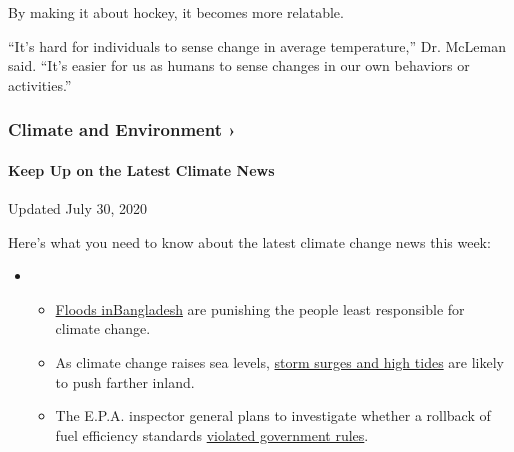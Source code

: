 By making it about hockey, it becomes more relatable.

``It's hard for individuals to sense change in average temperature,''
Dr. McLeman said. ``It's easier for us as humans to sense changes in our
own behaviors or activities.''

\href{https://www.nytimes3xbfgragh.onion/section/climate?action=click\&pgtype=Article\&state=default\&region=MAIN_CONTENT_1\&context=storylines_keepup}{}

\hypertarget{climate-and-environment-}{%
\subsubsection{Climate and Environment
›}\label{climate-and-environment-}}

\hypertarget{keep-up-on-the-latest-climate-news}{%
\paragraph{Keep Up on the Latest Climate
News}\label{keep-up-on-the-latest-climate-news}}

Updated July 30, 2020

Here's what you need to know about the latest climate change news this
week:

\begin{itemize}
\item
  \begin{itemize}
  \tightlist
  \item
    \href{https://www.nytimes3xbfgragh.onion/2020/07/30/climate/bangladesh-floods.html?action=click\&pgtype=Article\&state=default\&region=MAIN_CONTENT_1\&context=storylines_keepup}{Floods
    in}\href{https://www.nytimes3xbfgragh.onion/2020/07/30/climate/bangladesh-floods.html?action=click\&pgtype=Article\&state=default\&region=MAIN_CONTENT_1\&context=storylines_keepup}{Bangladesh}
    are punishing the people least responsible for climate change.
  \item
    As climate change raises sea levels,
    \href{https://www.nytimes3xbfgragh.onion/2020/07/30/climate/sea-level-inland-floods.html?action=click\&pgtype=Article\&state=default\&region=MAIN_CONTENT_1\&context=storylines_keepup}{storm
    surges and high tides} are likely to push farther inland.
  \item
    The E.P.A. inspector general plans to investigate whether a rollback
    of fuel efficiency standards
    \href{https://www.nytimes3xbfgragh.onion/2020/07/27/climate/trump-fuel-efficiency-rule.html?action=click\&pgtype=Article\&state=default\&region=MAIN_CONTENT_1\&context=storylines_keepup}{violated
    government rules}.
  \end{itemize}
\end{itemize}


